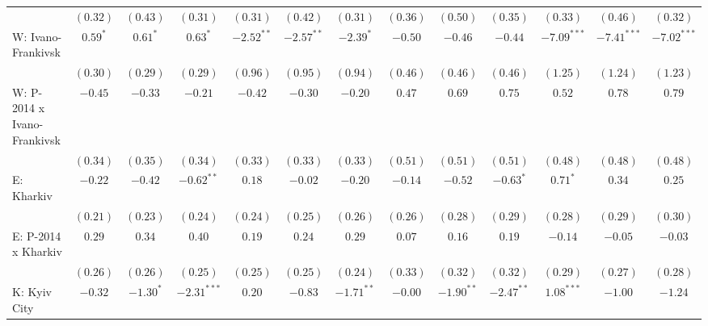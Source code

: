 \begin{table}
\begin{center}
\begin{tiny}
\begin{tabular}{l c c c c c c c c c c c c}
                            & $(0.32)$      & $(0.43)$      & $(0.31)$       & $(0.31)$      & $(0.42)$      & $(0.31)$      & $(0.36)$      & $(0.50)$       & $(0.35)$       & $(0.33)$       & $(0.46)$       & $(0.32)$       \\
W: Ivano-Frankivsk          & $0.59^{*}$    & $0.61^{*}$    & $0.63^{*}$     & $-2.52^{**}$  & $-2.57^{**}$  & $-2.39^{*}$   & $-0.50$       & $-0.46$        & $-0.44$        & $-7.09^{***}$  & $-7.41^{***}$  & $-7.02^{***}$  \\
                            & $(0.30)$      & $(0.29)$      & $(0.29)$       & $(0.96)$      & $(0.95)$      & $(0.94)$      & $(0.46)$      & $(0.46)$       & $(0.46)$       & $(1.25)$       & $(1.24)$       & $(1.23)$       \\
W: P-2014 x Ivano-Frankivsk & $-0.45$       & $-0.33$       & $-0.21$        & $-0.42$       & $-0.30$       & $-0.20$       & $0.47$        & $0.69$         & $0.75$         & $0.52$         & $0.78$         & $0.79$         \\
                            & $(0.34)$      & $(0.35)$      & $(0.34)$       & $(0.33)$      & $(0.33)$      & $(0.33)$      & $(0.51)$      & $(0.51)$       & $(0.51)$       & $(0.48)$       & $(0.48)$       & $(0.48)$       \\
E: Kharkiv                  & $-0.22$       & $-0.42$       & $-0.62^{**}$   & $0.18$        & $-0.02$       & $-0.20$       & $-0.14$       & $-0.52$        & $-0.63^{*}$    & $0.71^{*}$     & $0.34$         & $0.25$         \\
                            & $(0.21)$      & $(0.23)$      & $(0.24)$       & $(0.24)$      & $(0.25)$      & $(0.26)$      & $(0.26)$      & $(0.28)$       & $(0.29)$       & $(0.28)$       & $(0.29)$       & $(0.30)$       \\
E: P-2014 x Kharkiv         & $0.29$        & $0.34$        & $0.40$         & $0.19$        & $0.24$        & $0.29$        & $0.07$        & $0.16$         & $0.19$         & $-0.14$        & $-0.05$        & $-0.03$        \\
                            & $(0.26)$      & $(0.26)$      & $(0.25)$       & $(0.25)$      & $(0.25)$      & $(0.24)$      & $(0.33)$      & $(0.32)$       & $(0.32)$       & $(0.29)$       & $(0.27)$       & $(0.28)$       \\
K: Kyiv City                & $-0.32$       & $-1.30^{*}$   & $-2.31^{***}$  & $0.20$        & $-0.83$       & $-1.71^{**}$  & $-0.00$       & $-1.90^{**}$   & $-2.47^{**}$   & $1.08^{***}$   & $-1.00$        & $-1.24$        \\

\end{tabular}
\end{tiny}
\end{center}
\end{table}
